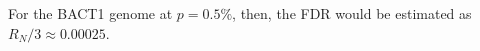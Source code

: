 For the BACT1 genome at $p = 0.5\%$, then,
the FDR would be estimated as $R_N / 3 \approx 0.00025$.
\endinput